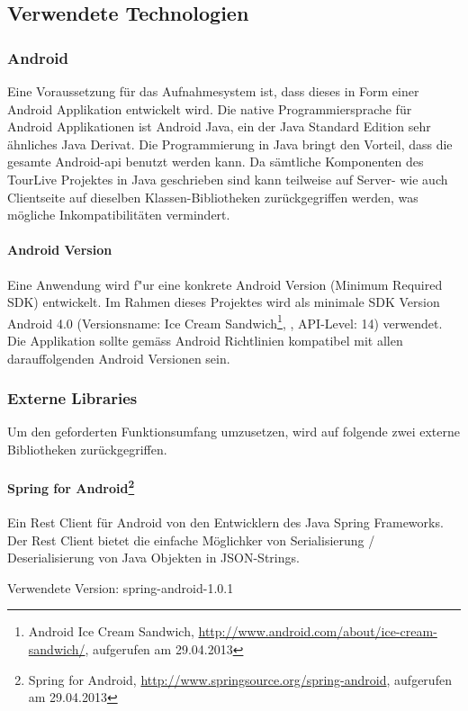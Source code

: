 \subsection{Verwendete Technologien}

\subsubsection{Android}
Eine Voraussetzung für das Aufnahmesystem ist, dass dieses in Form einer Android Applikation entwickelt wird. Die native Programmiersprache für Android Applikationen ist Android Java, ein der Java Standard Edition sehr ähnliches Java Derivat. Die Programmierung in Java bringt den Vorteil, dass die gesamte Android-\gls{api} benutzt werden kann. Da sämtliche Komponenten des TourLive Projektes in Java geschrieben sind kann teilweise auf Server- wie auch Clientseite auf dieselben Klassen-Bibliotheken zurückgegriffen werden, was mögliche Inkompatibilitäten vermindert. 

\paragraph{Android Version}
Eine Anwendung wird f"{u}r eine konkrete Android Version (Minimum Required SDK) entwickelt. Im Rahmen dieses Projektes wird als minimale SDK Version Android 4.0 (Versionsname: Ice Cream Sandwich\footnote{Android Ice Cream Sandwich, \url{http://www.android.com/about/ice-cream-sandwich/}, aufgerufen am 29.04.2013}, , API-Level: 14) verwendet. Die Applikation sollte gemäss Android Richtlinien kompatibel mit allen darauffolgenden Android Versionen sein.

\subsubsection{Externe Libraries}
Um den geforderten Funktionsumfang umzusetzen, wird auf folgende zwei externe Bibliotheken zurückgegriffen.

\paragraph{Spring for Android\footnote{Spring for Android, \url{http://www.springsource.org/spring-android}, aufgerufen am 29.04.2013} }
Ein Rest Client für Android von den Entwicklern des Java Spring Frameworks. Der Rest Client bietet die einfache Möglichker von Serialisierung / Deserialisierung von Java Objekten in JSON-Strings. 

Verwendete Version: spring-android-1.0.1

